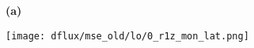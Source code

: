 \documentclass[preview]{standalone}
\begin{document}
\begin{figure}


%     

%     

%     


  \begin{subfigure}[t]{0.05\textwidth}
    \textbf{\large{(a)}}
  \end{subfigure}
  \begin{subfigure}[t]{0.95\textwidth}
    \texttt{[image: dflux/mse\_old/lo/0\_r1z\_mon\_lat.png]}
  \end{subfigure}


\end{figure}
\end{document}
